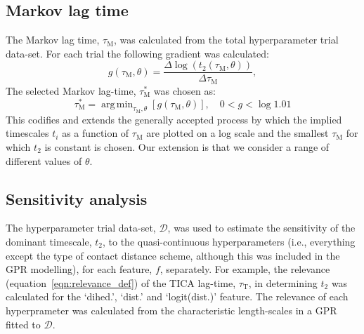 \documentclass[journal=jacsat,manuscript=article]{achemso}
\DeclareMathOperator*{\argmin}{arg\,min}
\begin{document}
\subsection{Markov lag time}
The Markov lag time, $\tau_{\mathrm{M}}$, was calculated from the total hyperparameter trial data-set. For each trial the following gradient was calculated:
\begin{equation}
    g(\tau_{\mathrm{M}}, \theta) = \frac{\Delta \log{\left(t_{2}(\tau_{\mathrm{M}}, \theta)\right)}}{\Delta \tau_{\mathrm{M}}}, 
\end{equation}\label{eqn:choose_lag_1}
The selected Markov lag-time, $\tau^{*}_{\mathrm{M}}$ was chosen as:
\begin{equation}
    \tau^{*}_{\mathrm{M}}  = \argmin_{\tau_{\mathrm{M}}, \theta}\left[g(\tau_{\mathrm{M}}, \theta)\right], \quad 0 < g < \log{1.01}
\end{equation}\label{eqn:choose_lag_2}
This codifies and extends the generally accepted process by which the implied timescales $t_{i}$ as a function of $\tau_{\mathrm{M}}$ are plotted on a log scale and the smallest $\tau_{\mathrm{M}}$ for which $t_{2}$ is constant is chosen. Our extension is that we consider a range of different values of $\theta$. 

\subsection{Sensitivity analysis}

The hyperparameter trial data-set, $\mathcal{D}$, was used to estimate the sensitivity of the dominant timescale, $t_2$, to the quasi-continuous hyperparameters (i.e., everything except the type of contact distance scheme, although this was included in the GPR modelling), for each feature, $f$, separately. For example, the relevance (equation~\ref{eqn:relevance_def}) of the TICA lag-time, $\tau_{\mathrm{T}}$, in determining $t_2$ was calculated for the `dihed.', `dist.' and `logit(dist.)' feature.  The relevance of each hyperprameter was calculated from the characteristic length-scales in a GPR fitted to $\mathcal{D}$.  
\end{document}
